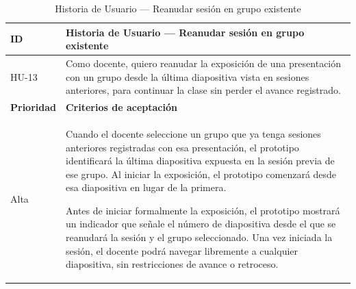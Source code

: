 \documentclass[11pt]{article}
\begin{document}
\begin{table}[H]
    \centering
    \renewcommand{\arraystretch}{1.2}
    \begin{tabular}{|p{2.5cm}|p{11cm}|}
        \hline
        \textbf{ID} & \textbf{Historia de Usuario --- Reanudar sesión en grupo existente} \\
        \hline
        HU-13 & Como docente, quiero reanudar la exposición de una presentación con un grupo desde la última diapositiva vista en sesiones anteriores, para continuar la clase sin perder el avance registrado. \\
        \hline
        \textbf{Prioridad} & \textbf{Criterios de aceptación} \\
        \hline
        Alta & Cuando el docente seleccione un grupo que ya tenga sesiones anteriores registradas con esa presentación, el prototipo identificará la última diapositiva expuesta en la sesión previa de ese grupo. Al iniciar la exposición, el prototipo comenzará desde esa diapositiva en lugar de la primera.

        Antes de iniciar formalmente la exposición, el prototipo mostrará un indicador que señale el número de diapositiva desde el que se reanudará la sesión y el grupo seleccionado. Una vez iniciada la sesión, el docente podrá navegar libremente a cualquier diapositiva, sin restricciones de avance o retroceso. \\
        \hline
    \end{tabular}
    \caption{Historia de Usuario --- Reanudar sesión en grupo existente}
    \label{tab:hu-reanudar-sesion-grupo}
\end{table}
\end{document}
